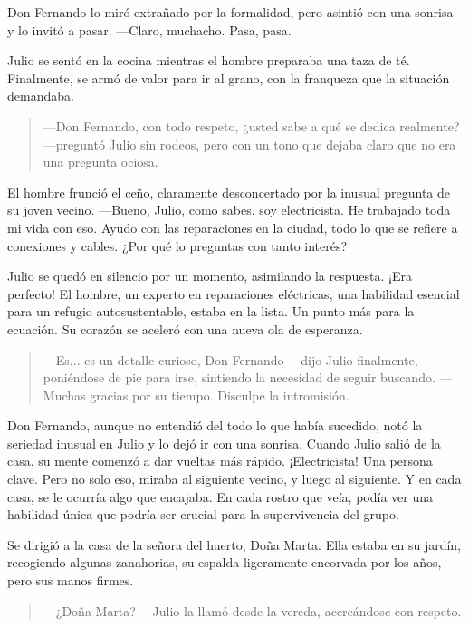 \documentclass[a4paper,12pt]{book}
\begin{document}
Don Fernando lo miró extrañado por la formalidad, pero asintió con una sonrisa y lo invitó a pasar. —Claro, muchacho. Pasa, pasa.

Julio se sentó en la cocina mientras el hombre preparaba una taza de té. Finalmente, se armó de valor para ir al grano, con la franqueza que la situación demandaba.

\begin{quote}
    —Don Fernando, con todo respeto, ¿usted sabe a qué se dedica realmente? —preguntó Julio sin rodeos, pero con un tono que dejaba claro que no era una pregunta ociosa.
\end{quote}

El hombre frunció el ceño, claramente desconcertado por la inusual pregunta de su joven vecino. —Bueno, Julio, como sabes, soy electricista. He trabajado toda mi vida con eso. Ayudo con las reparaciones en la ciudad, todo lo que se refiere a conexiones y cables. ¿Por qué lo preguntas con tanto interés?

Julio se quedó en silencio por un momento, asimilando la respuesta. ¡Era perfecto! El hombre, un experto en reparaciones eléctricas, una habilidad esencial para un refugio autosustentable, estaba en la lista. Un punto más para la ecuación. Su corazón se aceleró con una nueva ola de esperanza.

\begin{quote}
    —Es... es un detalle curioso, Don Fernando —dijo Julio finalmente, poniéndose de pie para irse, sintiendo la necesidad de seguir buscando. —Muchas gracias por su tiempo. Disculpe la intromisión.
\end{quote}

Don Fernando, aunque no entendió del todo lo que había sucedido, notó la seriedad inusual en Julio y lo dejó ir con una sonrisa. Cuando Julio salió de la casa, su mente comenzó a dar vueltas más rápido. ¡Electricista! Una persona clave. Pero no solo eso, miraba al siguiente vecino, y luego al siguiente. Y en cada casa, se le ocurría algo que encajaba. En cada rostro que veía, podía ver una habilidad única que podría ser crucial para la supervivencia del grupo.

Se dirigió a la casa de la señora del huerto, Doña Marta. Ella estaba en su jardín, recogiendo algunas zanahorias, su espalda ligeramente encorvada por los años, pero sus manos firmes.

\begin{quote}
    —¿Doña Marta? —Julio la llamó desde la vereda, acercándose con respeto.
\end{quote}
\end{document}
